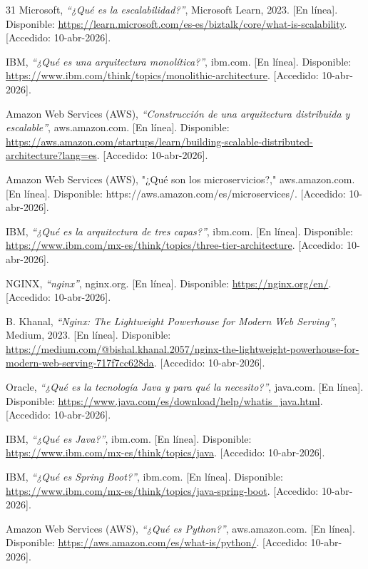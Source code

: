 \begin{thebibliography}{31}
Microsoft, \textit{``¿Qué es la escalabilidad?''}, Microsoft Learn, 2023. [En línea]. Disponible: \url{https://learn.microsoft.com/es-es/biztalk/core/what-is-scalability}. [Accedido: 10-abr-2026].

IBM, \textit{``¿Qué es una arquitectura monolítica?''}, ibm.com. [En línea]. Disponible: \url{https://www.ibm.com/think/topics/monolithic-architecture}. [Accedido: 10-abr-2026].

Amazon Web Services (AWS), \textit{``Construcción de una arquitectura distribuida y escalable''}, aws.amazon.com. [En línea]. Disponible: \url{https://aws.amazon.com/startups/learn/building-scalable-distributed-architecture?lang=es}. [Accedido: 10-abr-2026].

Amazon Web Services (AWS), "¿Qué son los microservicios?," aws.amazon.com. [En línea]. Disponible: https://aws.amazon.com/es/microservices/. [Accedido: 10-abr-2026].

IBM, \textit{``¿Qué es la arquitectura de tres capas?''}, ibm.com. [En línea]. Disponible: \url{https://www.ibm.com/mx-es/think/topics/three-tier-architecture}. [Accedido: 10-abr-2026].

NGINX, \textit{``nginx''}, nginx.org. [En línea]. Disponible: \url{https://nginx.org/en/}. [Accedido: 10-abr-2026].

B. Khanal, \textit{``Nginx: The Lightweight Powerhouse for Modern Web Serving''}, Medium, 2023. [En línea]. Disponible: \url{https://medium.com/@bishal.khanal.2057/nginx-the-lightweight-powerhouse-for-modern-web-serving-717f7cc628da}. [Accedido: 10-abr-2026].

Oracle, \textit{``¿Qué es la tecnología Java y para qué la necesito?''}, java.com. [En línea]. Disponible: \url{https://www.java.com/es/download/help/whatis_java.html}. [Accedido: 10-abr-2026].

IBM, \textit{``¿Qué es Java?''}, ibm.com. [En línea]. Disponible: \url{https://www.ibm.com/mx-es/think/topics/java}. [Accedido: 10-abr-2026].

IBM, \textit{``¿Qué es Spring Boot?''}, ibm.com. [En línea]. Disponible: \url{https://www.ibm.com/mx-es/think/topics/java-spring-boot}. [Accedido: 10-abr-2026].

Amazon Web Services (AWS), \textit{``¿Qué es Python?''}, aws.amazon.com. [En línea]. Disponible: \url{https://aws.amazon.com/es/what-is/python/}. [Accedido: 10-abr-2026].


\end{thebibliography}
